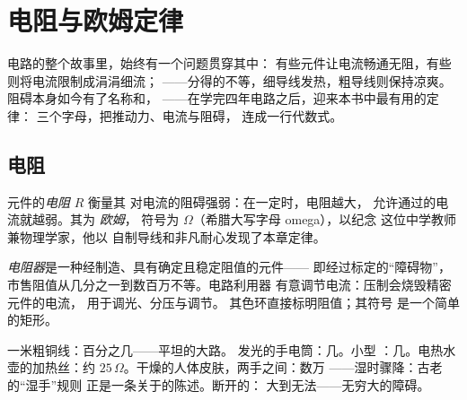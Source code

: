 \chapter{电阻与欧姆定律}\label{ch:g8:ohms-law}

电路的整个故事里，始终有一个问题贯穿其中：
有些元件让电流畅通无阻，有些则将电流限制成涓涓细流；
——分得的不等，细导线发热，粗导线则保持凉爽。
阻碍本身如今有了名称和，
——在学完四年电路之后，迎来本书中最有用的定律：
三个字母，把推动力、电流与阻碍，
连成一行代数式。

\section{电阻}

\begin{definition}[电阻]\label{def:g8:ohms-law:resistance}
元件的\emph{电阻} $R$ 衡量其
对电流的阻碍强弱：在一定时，电阻越大，
允许通过的电流就越弱。其为
\emph{欧姆}，
符号为 $\Omega$（希腊大写字母 omega），以纪念
这位中学教师兼物理学家，他以
自制导线和非凡耐心发现了本章定律。
\end{definition}

\begin{definition}[电阻器]\label{def:g8:ohms-law:resistor}
\emph{电阻器}是一种经制造、具有确定且稳定阻值的元件——
即经过标定的“障碍物”，
市售阻值从几分之一到数百万不等。电路利用器
有意调节电流：压制会烧毁精密元件的电流，
用于调光、分压与调节。
其色环直接标明阻值；其符号
是一个简单的矩形。
\end{definition}

\begin{example}[身边的电阻]\label{ex:g8:ohms-law:values}
一米粗铜线：百分之几——平坦的大路。
发光的手电筒：几。小型
：几。电热水壶的加热丝：约
$25\,\Omega$。干燥的人体皮肤，两手之间：数万
——湿时骤降：古老的“湿手”规则
正是一条关于的陈述。断开的：
大到无法——无穷大的障碍。
\end{example}


